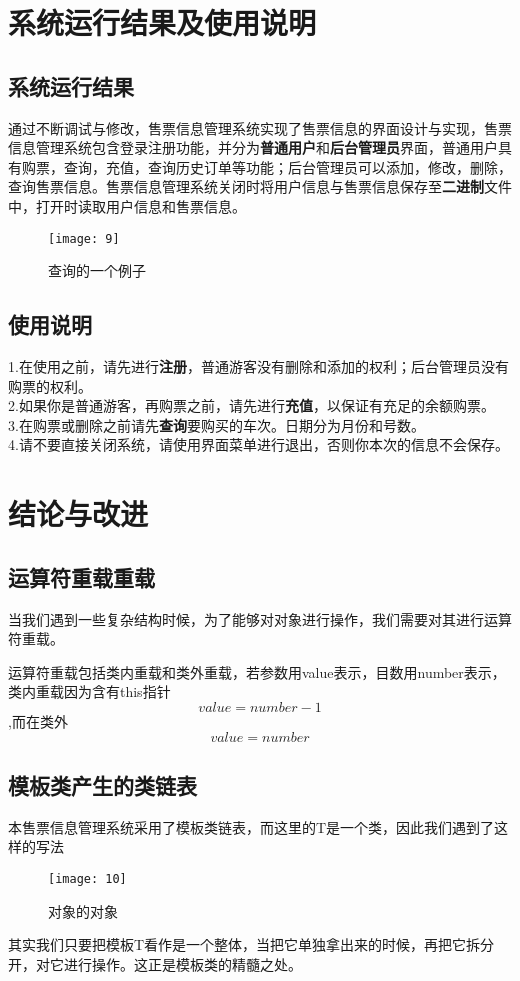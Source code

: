 \documentclass{apmcmthesis}
\begin{document}
\section{系统运行结果及使用说明}
\subsection{系统运行结果}
 通过不断调试与修改，售票信息管理系统实现了售票信息的界面设计与实现，售票信息管理系统包含登录注册功能，并分为\textbf{普通用户}和\textbf{后台管理员}界面，普通用户具有购票，查询，充值，查询历史订单等功能；后台管理员可以添加，修改，删除，查询售票信息。售票信息管理系统关闭时将用户信息与售票信息保存至\textbf{二进制}文件中，打开时读取用户信息和售票信息。
 \begin{figure}[H]
 	\texttt{[image: 9]}
 	\caption{查询的一个例子}
 \end{figure}
 



\subsection{使用说明}
1.在使用之前，请先进行\textbf{注册}，普通游客没有删除和添加的权利；后台管理员没有购票的权利。\\
2.如果你是普通游客，再购票之前，请先进行\textbf{充值}，以保证有充足的余额购票。\\
3.在购票或删除之前请先\textbf{查询}要购买的车次。日期分为月份和号数。\\
4.请不要直接关闭系统，请使用界面菜单进行退出，否则你本次的信息不会保存。





\section{结论与改进}


\subsection{运算符重载重载}
当我们遇到一些复杂结构时候，为了能够对对象进行操作，我们需要对其进行运算符重载。

运算符重载包括类内重载和类外重载，若参数用value表示，目数用number表示，类内重载因为含有this指针$$value=number-1$$,而在类外$$value=number$$
\subsection{模板类产生的类链表}
本售票信息管理系统采用了模板类链表，而这里的T是一个类，因此我们遇到了这样的写法\begin{figure}[H]
	\texttt{[image: 10]}
	\caption{对象的对象}
\end{figure}
其实我们只要把模板T看作是一个整体，当把它单独拿出来的时候，再把它拆分开，对它进行操作。这正是模板类的精髓之处。
\end{document}

